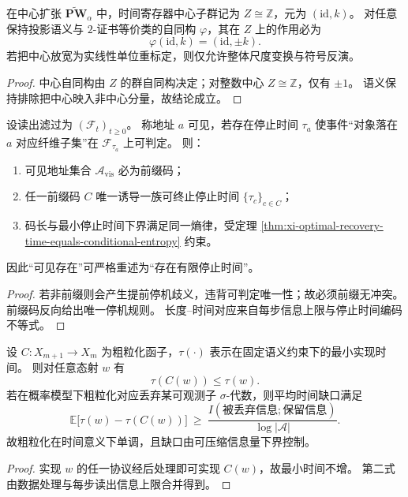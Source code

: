 \begin{theorem}\label{thm:xi-time-center-semantic-rigidity}
在中心扩张 \(\widetilde{\mathbf{PW}}_{\alpha}\) 中，时间寄存器中心子群记为
\(
Z\cong\mathbb Z
\)，元为 \((\mathrm{id},k)\)。
对任意保持投影语义与 \(2\)-证书等价类的自同构 \(\varphi\)，其在 \(Z\) 上的作用必为
\[
\varphi(\mathrm{id},k)=(\mathrm{id},\pm k).
\]
若把中心放宽为实线性单位重标定，则仅允许整体尺度变换与符号反演。
\end{theorem}

\begin{proof}
中心自同构由 \(Z\) 的群自同构决定；对整数中心 \(Z\cong\mathbb Z\)，仅有 \(\pm1\)。
语义保持排除把中心映入非中心分量，故结论成立。
\end{proof}

\begin{theorem}\label{thm:xi-address-stopping-time-equivalence}
设读出滤过为 \((\mathcal F_t)_{t\ge 0}\)。
称地址 \(a\) 可见，若存在停止时间 \(\tau_a\) 使事件“对象落在 \(a\) 对应纤维子集”在 \(\mathcal F_{\tau_a}\) 上可判定。
则：
\begin{enumerate}
  \item 可见地址集合 \(\mathcal A_{\mathrm{vis}}\) 必为前缀码；
  \item 任一前缀码 \(C\) 唯一诱导一族可终止停止时间 \(\{\tau_c\}_{c\in C}\)；
  \item 码长与最小停止时间下界满足同一熵律，受定理 \ref{thm:xi-optimal-recovery-time-equals-conditional-entropy} 约束。
\end{enumerate}
因此“可见存在”可严格重述为“存在有限停止时间”。
\end{theorem}

\begin{proof}
若非前缀则会产生提前停机歧义，违背可判定唯一性；故必须前缀无冲突。
前缀码反向给出唯一停机规则。
长度--时间对应来自每步信息上限与停止时间编码不等式。
\end{proof}

\begin{theorem}\label{thm:xi-time-monotone-under-coarse-graining}
设 \(C:X_{m+1}\to X_m\) 为粗粒化函子，\(\tau(\cdot)\) 表示在固定语义约束下的最小实现时间。
则对任意态射 \(w\) 有
\[
\tau(C(w))\le \tau(w).
\]
若在概率模型下粗粒化对应丢弃某可观测子 \(\sigma\)-代数，则平均时间缺口满足
\[
\mathbb E\!\bigl[\tau(w)-\tau(C(w))\bigr]
\ \ge\
\frac{I(\text{被丢弃信息};\text{保留信息})}{\log|\mathcal A|}.
\]
故粗粒化在时间意义下单调，且缺口由可压缩信息量下界控制。
\end{theorem}

\begin{proof}
实现 \(w\) 的任一协议经后处理即可实现 \(C(w)\)，故最小时间不增。
第二式由数据处理与每步读出信息上限合并得到。
\end{proof}

